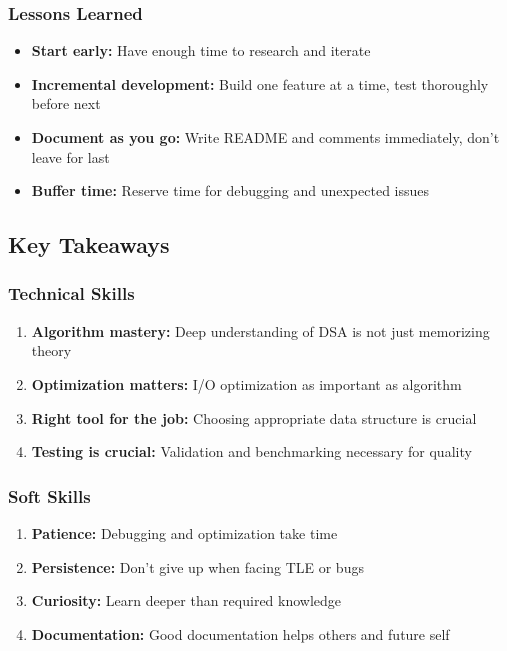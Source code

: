 \documentclass[12pt,a4paper]{article}
\begin{document}
\subsubsection{Lessons Learned}
\begin{itemize}
    \item \textbf{Start early:} Have enough time to research and iterate
    \item \textbf{Incremental development:} Build one feature at a time, test thoroughly before next
    \item \textbf{Document as you go:} Write README and comments immediately, don't leave for last
    \item \textbf{Buffer time:} Reserve time for debugging and unexpected issues
\end{itemize}

\subsection{Key Takeaways}

\subsubsection{Technical Skills}
\begin{enumerate}
    \item \textbf{Algorithm mastery:} Deep understanding of DSA is not just memorizing theory
    \item \textbf{Optimization matters:} I/O optimization as important as algorithm
    \item \textbf{Right tool for the job:} Choosing appropriate data structure is crucial
    \item \textbf{Testing is crucial:} Validation and benchmarking necessary for quality
\end{enumerate}

\subsubsection{Soft Skills}
\begin{enumerate}
    \item \textbf{Patience:} Debugging and optimization take time
    \item \textbf{Persistence:} Don't give up when facing TLE or bugs
    \item \textbf{Curiosity:} Learn deeper than required knowledge
    \item \textbf{Documentation:} Good documentation helps others and future self
\end{enumerate}
\end{document}
